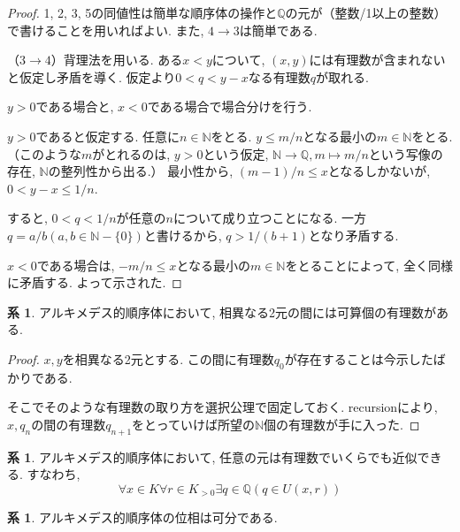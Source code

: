 \documentclass[a4paper, twoside]{bxjsarticle}
\newcommand{\nat}{\mathbb{N}}
\newcommand{\quo}{\mathbb{Q}}
\theoremstyle{definition}
\newtheorem{cor}[thm]{系}
\begin{document}
        \begin{proof}
            1, 2, 3, 5の同値性は簡単な順序体の操作と$\quo$の元が（整数/1以上の整数）で書けることを用いればよい. また, $4\to 3$は簡単である. 
            
            （$3\to 4$）背理法を用いる. ある$x<y$について, $(x, y)$には有理数が含まれないと仮定し矛盾を導く. 仮定より$0<q<y-x$なる有理数$q$が取れる.
            
            $y>0$である場合と, $x<0$である場合で場合分けを行う.
            
            $y>0$であると仮定する. 任意に$n\in\nat$をとる. $y\leq m/n$となる最小の$m\in\nat$をとる. （このような$m$がとれるのは, $y>0$という仮定, $\nat\to\quo, m\mapsto m/n$という写像の存在, $\nat$の整列性から出る.） 最小性から, $(m-1)/n\leq x$となるしかないが, $0<y-x\leq 1/n$.
            
            すると, $0<q<1/n$が任意の$n$について成り立つことになる. 一方$q=a/b (a, b\in \nat-\{0\})$と書けるから, $q>1/(b+1)$となり矛盾する.
            
            $x<0$である場合は, $-m/n\leq x$となる最小の$m\in\nat$をとることによって, 全く同様に矛盾する. よって示された.
        \end{proof}
        \begin{cor}
            アルキメデス的順序体において, 相異なる2元の間には可算個の有理数がある.
        \end{cor}
        \begin{proof}
            $x, y$を相異なる2元とする. この間に有理数$q_0$が存在することは今示したばかりである.
            
            そこでそのような有理数の取り方を選択公理で固定しておく. recursionにより, $x, q_n$の間の有理数$q_{n+1}$をとっていけば所望の$\nat$個の有理数が手に入った.
        \end{proof}
        \begin{cor}
            アルキメデス的順序体において, 任意の元は有理数でいくらでも近似できる. すなわち, \[\forall x\in K \forall r \in K_{>0} \exists q\in \quo (q\in U(x, r))\]
        \end{cor}
        \begin{cor}
            アルキメデス的順序体の位相は可分である.
        \end{cor}
\end{document}
